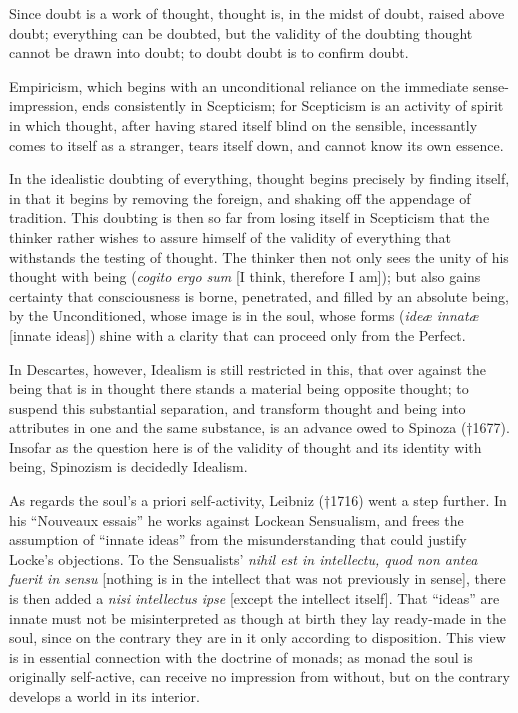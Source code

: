 \documentclass[12pt]{book}
\begin{document}
Since doubt is a work of thought, thought is, in the midst of doubt, raised above
doubt; everything can be doubted, but the validity of the doubting thought cannot
be drawn into doubt; to doubt doubt is to confirm doubt.

Empiricism, which begins with an unconditional reliance on the immediate
sense-impression, ends consistently in Scepticism; for Scepticism is an activity
of spirit in which thought, after having stared itself blind on the sensible,
incessantly comes to itself as a stranger, tears itself down, and cannot know its
own essence.

In the idealistic doubting of everything, thought begins precisely by finding
itself, in that it begins by removing the foreign, and shaking off the appendage
of tradition. This doubting is then so far from losing itself in Scepticism that
the thinker rather wishes to assure himself of the validity of everything that
withstands the testing of thought.
The thinker then not only sees the unity of his thought with being
(\textit{cogito ergo sum} [I think, therefore I am]); but also gains certainty
that consciousness is borne, penetrated, and filled by an absolute being, by the
Unconditioned, whose image is in the soul, whose forms (\textit{ideæ innatæ}
[innate ideas]) shine with a clarity that can proceed only from the Perfect.

In Descartes, however, Idealism is still restricted in this, that over against the
being that is in thought there stands a material being opposite thought; to
suspend this substantial separation, and transform thought and being into
attributes in one and the same substance, is an advance owed to Spinoza (†1677).
Insofar as the question here is of the validity of thought and its identity with
being, Spinozism is decidedly Idealism.

As regards the soul's a priori self-activity, Leibniz (†1716) went a step
further. In his ``Nouveaux essais'' he works against Lockean Sensualism, and frees
the assumption of ``innate ideas'' from the misunderstanding that could justify
Locke's objections. To the Sensualists' \textit{nihil est in intellectu, quod non
antea fuerit in sensu} [nothing is in the intellect that was not previously in
sense], there is then added a \textit{nisi intellectus ipse} [except the intellect
itself]. That ``ideas'' are innate must not be misinterpreted as though at birth
they lay ready-made in the soul, since on the contrary they are in it only
according to disposition. This view is in essential connection with the doctrine
of monads; as monad the soul is originally self-active, can receive no impression
from without, but on the contrary develops a world in its interior.
\end{document}
